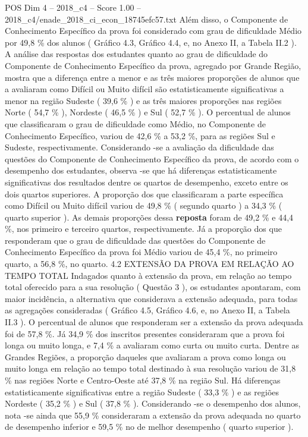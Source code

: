 \begin{textsample}{POS Dim 4 – 2018\_c4 – Score 1.00 – 2018\_c4/enade\_2018\_ci\_econ\_18745efc57.txt}
Além disso, o Componente de Conhecimento Específico da prova foi considerado com grau de dificuldade Médio por 49,8 \% dos alunos ( Gráfico 4.3, Gráfico 4.4, e, no Anexo II, a Tabela II.2 ).
A análise das respostas dos estudantes quanto ao grau de dificuldade do Componente de Conhecimento Específico da prova, agregado por Grande Região, mostra que a diferença entre a menor e as três maiores proporções de alunos que a avaliaram como Difícil ou Muito difícil são estatisticamente significativas a menor na região Sudeste ( 39,6 \% ) e as três maiores proporções nas regiões Norte ( 54,7 \% ), Nordeste ( 46,5 \% ) e Sul ( 52,7 \% ).
O percentual de alunos que classificaram o grau de dificuldade como Médio, no Componente de Conhecimento Específico, variou de 42,6 \% a 53,2 \%, para as regiões Sul e Sudeste, respectivamente.
Considerando -se a avaliação da dificuldade das questões do Componente de Conhecimento Específico da prova, de acordo com o desempenho dos estudantes, observa -se que há diferenças estatisticamente significativas dos resultados dentre os quartos de desempenho, exceto entre os dois quartos superiores.
A proporção dos que classificaram a parte específica como Difícil ou Muito difícil variou de 49,8 \% ( segundo quarto ) a 34,3 \% ( quarto superior ).
As demais proporções dessa \textbf{reposta} foram de 49,2 \% e 44,4 \%, nos primeiro e terceiro quartos, respectivamente.
Já a proporção dos que responderam que o grau de dificuldade das questões do Componente de Conhecimento Específico da prova foi Médio variou de 45,4 \%, no primeiro quarto, a 56,8 \%, no quarto. 4.2 EXTENSÃO DA PROVA EM RELAÇÃO AO TEMPO TOTAL Indagados quanto à extensão da prova, em relação ao tempo total oferecido para a sua resolução ( Questão 3 ), os estudantes apontaram, com maior incidência, a alternativa que considerava a extensão adequada, para todas as agregações consideradas ( Gráfico 4.5, Gráfico 4.6, e, no Anexo II, a Tabela II.3 ).
O percentual de alunos que responderam ser a extensão da prova adequada foi de 57,8 \%.
Já 34,9 \% dos inscritos presentes consideraram que a prova foi longa ou muito longa, e 7,4 \% a avaliaram como curta ou muito curta.
Dentre as Grandes Regiões, a proporção daqueles que avaliaram a prova como longa ou muito longa em relação ao tempo total destinado à sua resolução variou de 31,8 \% nas regiões Norte e Centro-Oeste até 37,8 \% na região Sul.
Há diferenças estatisticamente significativas entre a região Sudeste ( 33,3 \% ) e as regiões Nordeste ( 35,2 \% ) e Sul ( 37,8 \% ).
Considerando -se o desempenho dos alunos, nota -se ainda que 55,9 \% consideraram a extensão da prova adequada no quarto de desempenho inferior e 59,5 \% no de melhor desempenho ( quarto superior ).

\end{textsample}
